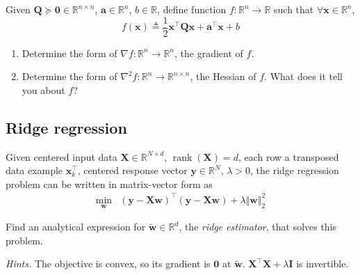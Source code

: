 \documentclass{article}
\numberwithin{equation}{section}
\begin{document}
Given $ \mathbf{Q} \succeq \mathbf{0} \in \mathbb{R}^{n \times n} $,
$ \mathbf{a} \in \mathbb{R}^n $, $ b \in \mathbb{R} $, define function
$ f : \mathbb{R}^n \rightarrow \mathbb{R} $ such that $ \forall \mathbf{x} \in
\mathbb{R}^n $,
\begin{equation*}
    f(\mathbf{x}) \triangleq \frac{1}{2}\mathbf{x}^\top\mathbf{Qx} +
    \mathbf{a}^\top\mathbf{x} + b
\end{equation*}

\begin{enumerate}[label = \alph*.]
    \item
    Determine the form of $ \nabla f : \mathbb{R}^n \rightarrow
    \mathbb{R}^n $, the gradient of $ f $.

    \item
    Determine the form of $ \nabla^2f : \mathbb{R}^n \rightarrow
    \mathbb{R}^{n \times n} $, the Hessian of $ f $. What does it tell you
    about $ f $?
\end{enumerate}

\subsection{Ridge regression}

Given centered input data $ \mathbf{X} \in \mathbb{R}^{N \times d} $,
$ \operatorname{rank}(\mathbf{X}) = d $, each row a transposed data example
$ \mathbf{x}_k^\top $, centered response vector
$ \mathbf{y} \in \mathbb{R}^N $, $ \lambda > 0 $, the ridge regression problem
can be written in matrix-vector form as
\begin{equation*}
    \begin{array}{ll}
        \displaystyle\min_\mathbf{w} &
        (\mathbf{y} - \mathbf{Xw})^\top(\mathbf{y} - \mathbf{Xw}) +
        \lambda\Vert\mathbf{w}\Vert_2^2
    \end{array}
\end{equation*}

Find an analytical expression for $ \tilde{\mathbf{w}} \in \mathbb{R}^d $, the
\textit{ridge estimator}, that solves this problem.

\medskip

\textit{Hints.} The objective is convex, so its gradient is $ \mathbf{0} $ at
$ \tilde{\mathbf{w}} $. $ \mathbf{X}^\top\mathbf{X} + \lambda\mathbf{I} $ is
invertible.



\end{document}

